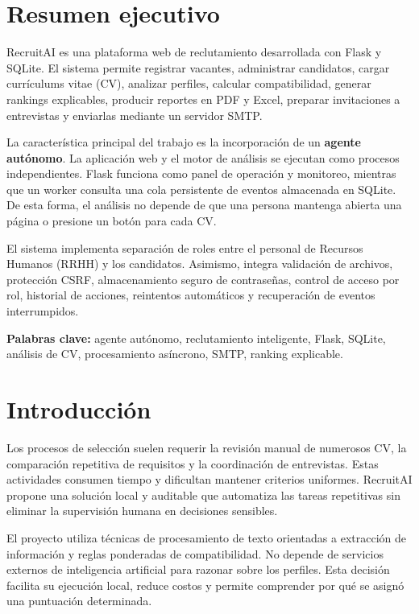 \documentclass[12pt,a4paper]{article}
\newcommand{\projectname}{RecruitAI}
\begin{document}
\section{Resumen ejecutivo}

\projectname{} es una plataforma web de reclutamiento desarrollada con Flask y SQLite. El sistema permite registrar vacantes, administrar candidatos, cargar currículums vitae (CV), analizar perfiles, calcular compatibilidad, generar rankings explicables, producir reportes en PDF y Excel, preparar invitaciones a entrevistas y enviarlas mediante un servidor SMTP.

La característica principal del trabajo es la incorporación de un \textbf{agente autónomo}. La aplicación web y el motor de análisis se ejecutan como procesos independientes. Flask funciona como panel de operación y monitoreo, mientras que un worker consulta una cola persistente de eventos almacenada en SQLite. De esta forma, el análisis no depende de que una persona mantenga abierta una página o presione un botón para cada CV.

El sistema implementa separación de roles entre el personal de Recursos Humanos (RRHH) y los candidatos. Asimismo, integra validación de archivos, protección CSRF, almacenamiento seguro de contraseñas, control de acceso por rol, historial de acciones, reintentos automáticos y recuperación de eventos interrumpidos.

\textbf{Palabras clave:} agente autónomo, reclutamiento inteligente, Flask, SQLite, análisis de CV, procesamiento asíncrono, SMTP, ranking explicable.

\section{Introducción}

Los procesos de selección suelen requerir la revisión manual de numerosos CV, la comparación repetitiva de requisitos y la coordinación de entrevistas. Estas actividades consumen tiempo y dificultan mantener criterios uniformes. \projectname{} propone una solución local y auditable que automatiza las tareas repetitivas sin eliminar la supervisión humana en decisiones sensibles.

El proyecto utiliza técnicas de procesamiento de texto orientadas a extracción de información y reglas ponderadas de compatibilidad. No depende de servicios externos de inteligencia artificial para razonar sobre los perfiles. Esta decisión facilita su ejecución local, reduce costos y permite comprender por qué se asignó una puntuación determinada.
\end{document}
